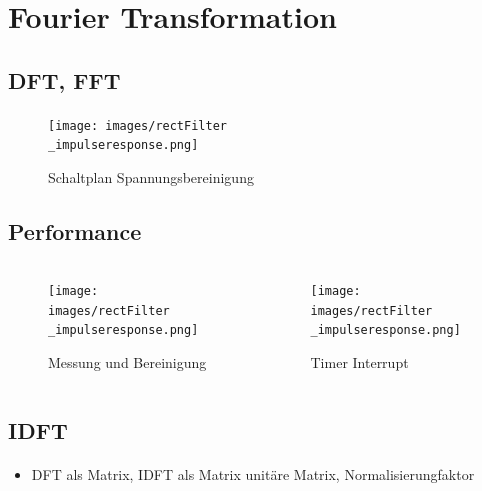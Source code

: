 \section{Fourier Transformation}
\subsection{DFT, FFT}
\begin{frame}{\insertsection}
	\framesubtitle{\insertsubsection}
	
	\begin{figure}
		\texttt{[image: images/rectFilter\\\_impulseresponse.png]}
		\caption*{Schaltplan Spannungsbereinigung}
	\end{figure}

\end{frame}


\subsection{Performance}
\begin{frame}{\insertsection}
	\framesubtitle{\insertsubsection}

	\begin{columns}[T] %
	\begin{column}{0.48\textwidth}
		\begin{figure}
			\texttt{[image: images/rectFilter\\\_impulseresponse.png]}
			\caption*{Messung und Bereinigung}
		\end{figure}
	\end{column}
	\hfill
	\begin{column}{0.48\textwidth}
		\begin{figure}
			\texttt{[image: images/rectFilter\\\_impulseresponse.png]}
			\caption*{Timer Interrupt}
		\end{figure}
	\end{column}
	\end{columns}
\end{frame}


\subsection{IDFT}
\begin{frame}{\insertsection}
	\framesubtitle{\insertsubsection}
	
	\begin{itemize}
		\item DFT als Matrix, IDFT als Matrix unitäre Matrix, Normalisierungfaktor
	\end{itemize}
\end{frame}


